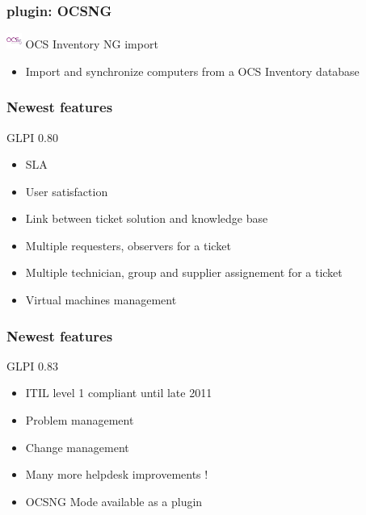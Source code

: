 \documentclass{beamer}
\begin{document}
\begin{frame}
    \frametitle{plugin: OCSNG}


    \begin{block}{\includegraphics[height=0.5cm]{./pics/plugins/ocsinventory.jpg} OCS Inventory NG import}
        \begin{itemize}
            \item Import and synchronize computers from a OCS Inventory database
        \end{itemize}
    \end{block}

\end{frame}



\begin{frame}

    \frametitle{Newest features}

    \begin{block}{GLPI 0.80}
        \begin{itemize}
            \item SLA
            \item User satisfaction
            \item Link between ticket solution and knowledge base
            \item Multiple requesters, observers for a ticket
            \item Multiple technician, group and supplier assignement for a ticket
            \item Virtual machines management
        \end{itemize}
    \end{block}

\end{frame}

\begin{frame}

    \frametitle{Newest features}

    \begin{block}{GLPI 0.83}
        \begin{itemize}
            \item ITIL level 1 compliant until late 2011
            \item Problem management
            \item Change management
            \item Many more helpdesk improvements !
            \item OCSNG Mode available as a plugin
        \end{itemize}
    \end{block}

\end{frame}
\end{document}
